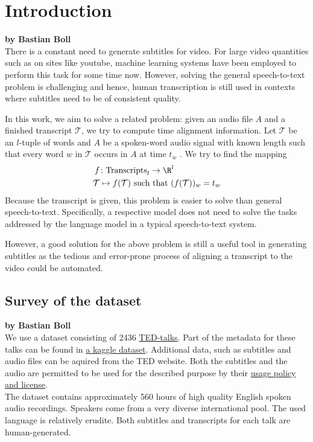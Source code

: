 \chapter{Introduction}
\label{chap:intro}

\textbf{by Bastian Boll} \\

There is a constant need to generate subtitles for video. For large video quantities such as on sites like youtube, machine learning systems have been employed to perform this task for some time now. However, solving the general speech-to-text problem is challenging and hence, human transcription is still used in contexts where subtitles need to be of consistent quality.

In this work, we aim to solve a related problem: given an audio file $A$ and a finished transcript $\mathcal{T}$, we try to compute time alignment information. Let $\mathcal{T}$ be an $l$-tuple of words and $A$ be a spoken-word audio signal with known length such that every word $w$ in $\mathcal{T}$ occurs in $A$ at time $t_w$ . We try to find the mapping
\begin{align*}
	f&\colon\textrm{Transcripts}_l\to\R^l\\
	\mathcal{T}&\mapsto f(\mathcal{T})\textrm{ such that }(f(\mathcal{T}))_w=t_w
\end{align*}
Because the transcript is given, this problem is easier to solve than general speech-to-text. Specifically, a respective model does not need to solve the tasks addressed by the language model in a typical speech-to-text system.

However, a good solution for the above problem is still a useful tool in generating subtitles as the tedious and error-prone process of aligning a transcript to the video could be automated.

\section{Survey of the dataset}

\textbf{by Bastian Boll} \\

We use a dataset consisting of 2436 \href{https://www.ted.com}{TED-talks}. Part of the metadata for these talks can be found in \href{https://www.kaggle.com/rounakbanik/ted-talks}{a kaggle dataset}. Additional data, such as subtitles and audio files can be aquired from the TED website. Both the subtitles and the audio are permitted to be used for the described purpose by their \href{https://www.ted.com/about/our-organization/our-policies-terms/ted-talks-usage-policy}{usage policy and license}.\\
The dataset contains approximately 560 hours of high quality English spoken audio recordings. Speakers come from a very diverse international pool. The used language is relatively erudite. Both subtitles and transcripts for each talk are human-generated.

